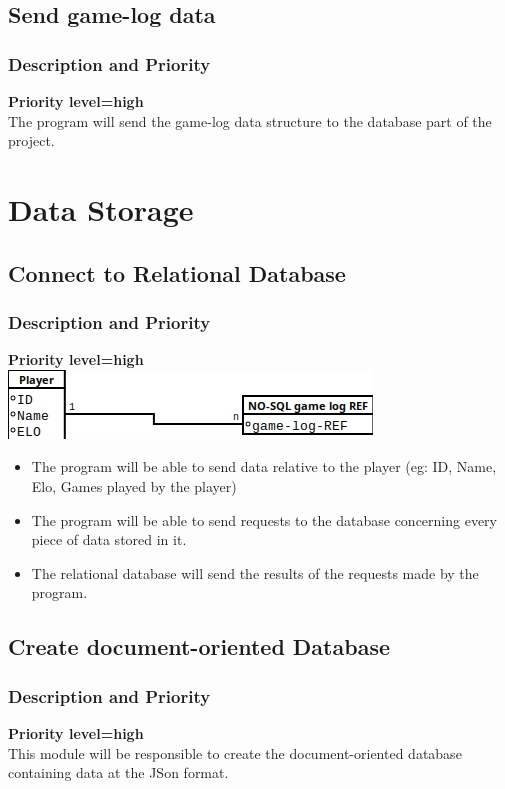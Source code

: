 \documentclass{scrreprt}
\begin{document}
\subsection{Send game-log data}
\subsubsection{Description and Priority}
\textbf{Priority level=high}\\
The program will send the game-log data structure to the database part of the project.
\section{Data Storage}


\subsection{Connect to Relational Database}
\subsubsection{Description and Priority}
\textbf{Priority level=high}\\
\includegraphics[keepaspectratio]{SQL}
\begin{itemize}
\item The program will be able to send data relative to the player (eg: ID, Name, Elo, Games played by the player)
\item The program will be able to send requests to the database concerning every piece of data stored in it.
\item The relational database will send the results of the requests made by the program.
\end{itemize}


\subsection{Create document-oriented Database}

\subsubsection{Description and Priority}
\textbf{Priority level=high}\\
This module will be responsible to create the document-oriented database containing data at the JSon format.
\end{document}
